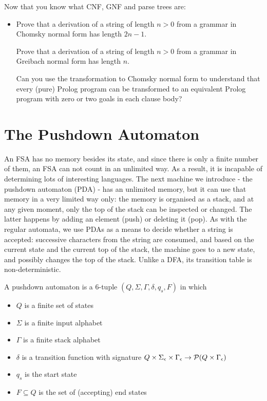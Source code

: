 \begin{exercise}
Now that you know what CNF, GNF and parse trees are:
\begin{itemize}
\item[]
Prove that a derivation of a string of length $n > 0$ from a grammar
in Chomsky normal form has length $2n-1$.

Prove that a derivation of a string of length $n > 0$ from a grammar
in Greibach normal form has length $n$.

Can you use the transformation to Chomsky normal form to understand
that every (pure) Prolog program can be transformed to an equivalent
Prolog program with zero or two goals in each clause body?
\end{itemize}
\end{exercise}


\section{The Pushdown Automaton}
An FSA has no memory besides its state, and since there is only a
finite number of them, an FSA can not count in an unlimited way. As a
result, it is incapable of determining lots of interesting
languages. The next machine we introduce - the pushdown automaton
(PDA) - has an unlimited memory, but it can use that memory in a very
limited way only: the memory is organised as a stack, and at any given
moment, only the top of the stack can be inspected or changed. The
latter happens by adding an element (push) or deleting it (pop).
As with the regular automata, we use PDAs as a means to decide whether
a string is accepted: successive characters from the string are
consumed, and based on the current state and the current top of the
stack, the machine goes to a new state, and possibly changes the top
of the stack. Unlike a DFA, its transition table is non-deterministic. %

\begin{definition}
A pushdown automaton is a 6-tuple
$(Q,\Sigma,\Gamma,\delta,q_s,F)$ in which
\begin{itemize}
\item $Q$ is a finite set of states
\item $\Sigma$ is a finite input alphabet
\item $\Gamma$ is a finite stack alphabet
\item $\delta$ is a transition function with signature
%
$Q \times \Sigma_\epsilon \times \Gamma_\epsilon \rightarrow {\cal P}(Q \times  \Gamma_\epsilon)$
\item $q_s$ is the start state
\item $F \subseteq Q$ is the set of (accepting) end states
\end{itemize}
\end{definition}

